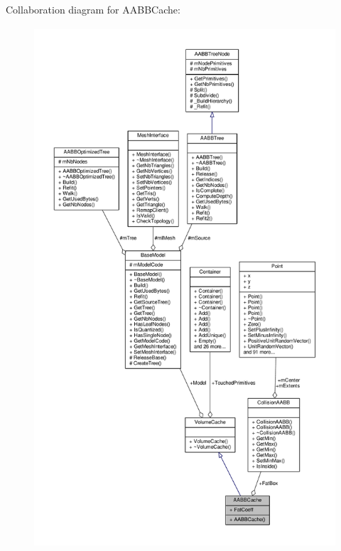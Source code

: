 Collaboration diagram for A\+A\+B\+B\+Cache\+:
\nopagebreak
\begin{figure}[H]
\begin{center}
\leavevmode
\includegraphics[height=550pt]{da/d40/structAABBCache__coll__graph}
\end{center}
\end{figure}
